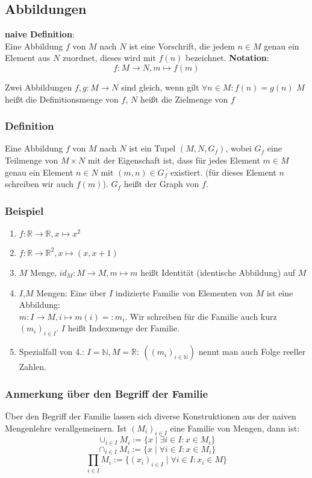 \documentclass[a4paper]{scrartcl}
\DeclareMathOperator{\Forall}{\forall}
\theoremstyle{definition}
\theoremstyle{plain}
\theoremstyle{plain}
\theoremstyle{remark}
\theoremstyle{remark}
\theoremstyle{remark}
\theoremstyle{remark}
\theoremstyle{remark}
\begin{document}
\subsection{Abbildungen}
\label{sec-2-6}
\textbf{naive Definition}: \\
   Eine Abbildung $f$ von $M$ nach $N$ ist eine Vorschrift, die jedem $n\in M$ genau ein Element aus $N$ zuordnet, dieses wird mit $f(n)$ bezeichnet.
\textbf{Notation}: \\
   \[f:M\to N,m\mapsto f(m)\]

Zwei Abbildungen $f,g:M\to N$ sind gleich, wenn gilt $\Forall n\in M:f(n) = g(n)$
$M$ heißt die Definitionsmenge von $f$, $N$ heißt die Zielmenge von $f$
\subsubsection{Definition}
\label{sec-2-6-1}
Eine Abbildung $f$ von $M$ nach $N$ ist ein Tupel $(M,N,G_f)$, wobei $G_f$ eine Teilmenge von $M\times N$ mit der Eigenschaft ist, dass für jedes Element $m\in M$ genau ein Element $n\in N$ mit $(m,n) \in G_f$ existiert.
(für dieses Element $n$ schreiben wir auch $f(m)$). $G_f$ heißt der Graph von $f$.
\subsubsection{Beispiel}
\label{sec-2-6-2}
\begin{enumerate}
\item $f:\mathbb{R}\to\mathbb{R}, x\mapsto x^2$
\item $f:\mathbb{R}\to\mathbb{R}^2,x\mapsto (x,x+1)$
\item $M$ Menge, $id_M: M\to M,m\mapsto m$ heißt Identität (identische Abbildung) auf $M$
\item $I$,$M$ Mengen: Eine über $I$ indizierte Familie von Elementen von $M$ ist eine Abbildung: \\
       $m:I\to M,i\mapsto m(i) =: m_i$. Wir schreiben für die Familie auch kurz $(m_i)_{i\in I}$. $I$ heißt Indexmenge der Familie.
\item Spezialfall von 4.: $I = \mathbb{N},M = \mathbb{R}:~((m_i)_{i\in\mathbb{N}})$ nennt man auch Folge reeller Zahlen.
\end{enumerate}
\subsubsection{Anmerkung über den Begriff der Familie}
\label{sec-2-6-3}
Über den Begriff der Familie lassen sich diverse Konstruktionen aus der naiven Mengenlehre verallgemeinern.
Ist $(M_i)_{i\in I}$ eine Familie von Mengen, dann ist:
\[\cup_{i\in I} M_i:=\{x\mid\exists i\in I: x\in M_i\}\]
\[\cap_{i\in I}M_i := \{x\mid\Forall i\in I: x\in M_i\}\]
\[\prod_{i\in I}M_i := \{(x_i)_{i\in I}\mid \Forall i\in I: x_i \in M\}\]
\end{document}
